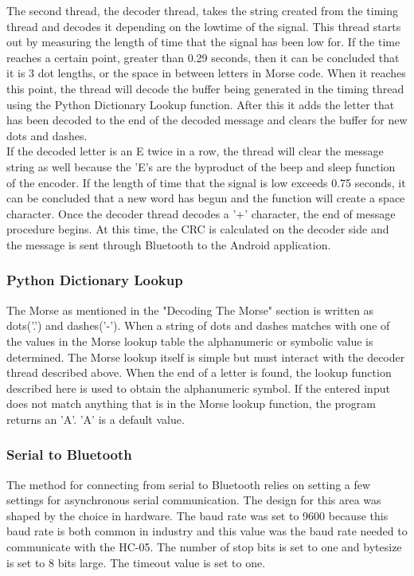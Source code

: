 \documentclass[12pt, letterpaper]{article}
\begin{document}
The second thread, the decoder thread, takes the string created from the timing thread and decodes it depending on the lowtime of the signal. This thread starts out by measuring the length of time that the signal has been low for. If the time reaches a certain point, greater than 0.29 seconds, then it can be concluded that it is 3 dot lengths, or the space in between letters in Morse code. When it reaches this point, the thread will decode the buffer being generated in the timing thread using the Python Dictionary Lookup function. After this it adds the letter that has been decoded to the end of the decoded message and clears the buffer for new dots and dashes. \\

If the decoded letter is an E twice in a row, the thread will clear the message string as well because the 'E's are the byproduct of the beep and sleep function of the encoder. If the length of time that the signal is low exceeds 0.75 seconds, it can be concluded that a new word has begun and the function will create a space character. Once the decoder thread decodes a '+' character, the end of message procedure begins. At this time, the CRC is calculated on the decoder side and the message is sent through Bluetooth to the Android application. 






\subsubsection{Python Dictionary Lookup}
The Morse as mentioned in the "Decoding The Morse" section is written as dots('.') and dashes('-'). When a string of dots and dashes matches with one of the values in the Morse lookup table the alphanumeric or symbolic value is determined. The Morse lookup itself is simple but must interact with the decoder thread described above. When the end of a letter is found, the lookup function described here is used to obtain the alphanumeric symbol. If the entered input does not match anything that is in the Morse lookup function, the program returns an 'A'. 'A' is a default value.

\subsubsection{Serial to Bluetooth}
The method for connecting from serial to Bluetooth relies on setting a few settings for asynchronous serial communication. The design for this area was shaped by the choice in hardware. The baud rate was set to 9600 because this baud rate is both common in industry and this value was the baud rate needed to communicate with the HC-05. The number of stop bits is set to one and bytesize is set to 8 bits large. The timeout value is set to one.\\
\end{document}
